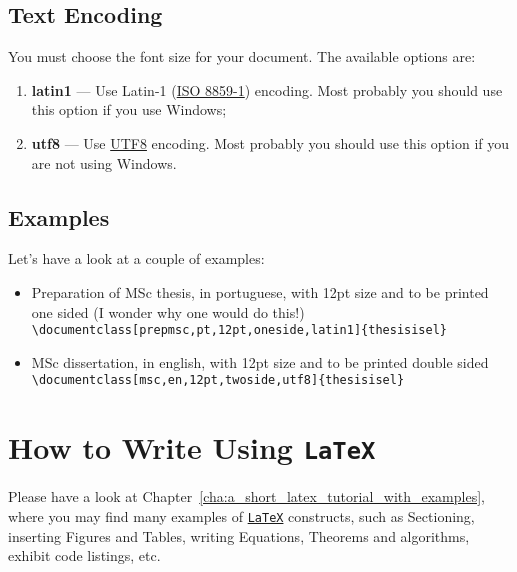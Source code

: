 \subsection{Text Encoding} %
\label{ssec:text_encoding}

You must choose the font size for your document. The available options are:
\begin{enumerate}
	\item \textbf{latin1} --- Use Latin-1 (\href{http://en.wikipedia.org/wiki/ISO/IEC_8859-1}{ISO 8859-1}) encoding.  Most probably you should use this option if you use Windows;
	\item \textbf{utf8} --- Use \href{http://en.wikipedia.org/wiki/UTF-8}{UTF8} encoding.    Most probably you should use this option if you are not using Windows.
\end{enumerate}

\subsection{Examples} %
\label{ssec:examples}

Let's have a look at a couple of examples:

\begin{itemize}
	\item Preparation of MSc thesis, in portuguese, with 12pt size and to be printed one sided (I wonder why one would do this!)\\
	\verb!\documentclass[prepmsc,pt,12pt,oneside,latin1]{thesisisel}!
	\item MSc dissertation, in english, with 12pt size and to be printed double sided\\
	\verb!\documentclass[msc,en,12pt,twoside,utf8]{thesisisel}!
\end{itemize}

\section{How to Write Using \texttt{LaTeX}} %
\label{sec:how_to_write_using_latex}

Please have a look at Chapter~\ref{cha:a_short_latex_tutorial_with_examples}, where you may find many examples of \href{http://tobi.oetiker.ch/lshort/lshort.pdf}{\texttt{LaTeX}} constructs, such as Sectioning, inserting Figures and Tables, writing Equations, Theorems and algorithms, exhibit code listings, etc.

